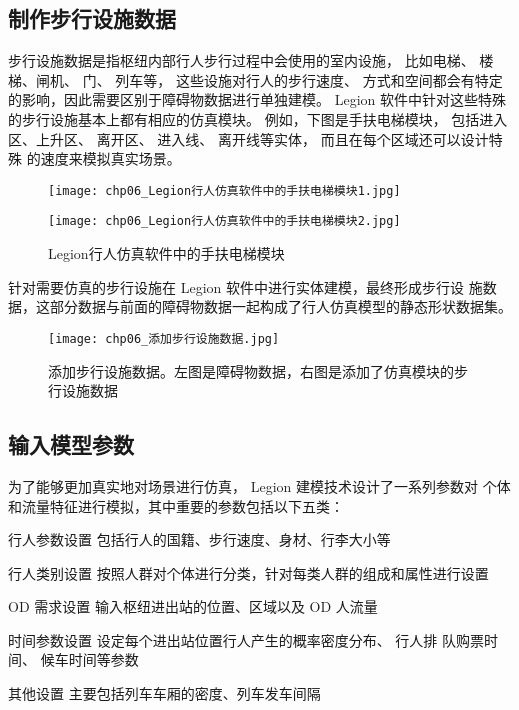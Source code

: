 \subsection{制作步行设施数据}
步行设施数据是指枢纽内部行人步行过程中会使用的室内设施， 比如电梯、
楼梯、闸机、 门、 列车等， 这些设施对行人的步行速度、 方式和空间都会有特定
的影响，因此需要区别于障碍物数据进行单独建模。 Legion 软件中针对这些特殊
的步行设施基本上都有相应的仿真模块。 例如，下图是手扶电梯模块， 包括进入
区、上升区、 离开区、 进入线、 离开线等实体， 而且在每个区域还可以设计特殊
的速度来模拟真实场景。

\begin{figure}[!ht]
  \centering
  \texttt{[image: chp06\_Legion行人仿真软件中的手扶电梯模块1.jpg]} 
\end{figure}

\begin{figure}[!ht]
  \centering
  \texttt{[image: chp06\_Legion行人仿真软件中的手扶电梯模块2.jpg]}
  \caption{Legion行人仿真软件中的手扶电梯模块\label{fig:chp06_Legion行人仿真软件中的手扶电梯模块} }
\end{figure}

针对需要仿真的步行设施在 Legion 软件中进行实体建模，最终形成步行设
施数据，这部分数据与前面的障碍物数据一起构成了行人仿真模型的静态形状数据集。

\begin{figure}[!ht]
  \centering
  \texttt{[image: chp06\_添加步行设施数据.jpg]}
  \caption[添加步行设施数据]{添加步行设施数据。左图是障碍物数据，右图是添加了仿真模块的步行设施数据
\label{fig:chp06_添加步行设施数据} }
\end{figure}

\subsection{输入模型参数}
为了能够更加真实地对场景进行仿真， Legion 建模技术设计了一系列参数对
个体和流量特征进行模拟，其中重要的参数包括以下五类：

\begin{para}
\item[行人参数设置]包括行人的国籍、步行速度、身材、行李大小等
\item[行人类别设置]按照人群对个体进行分类，针对每类人群的组成和属性进行设置
\item[OD 需求设置]输入枢纽进出站的位置、区域以及 OD 人流量
\item[时间参数设置]设定每个进出站位置行人产生的概率密度分布、 行人排
队购票时间、 候车时间等参数
\item[其他设置]主要包括列车车厢的密度、列车发车间隔
\end{para}

